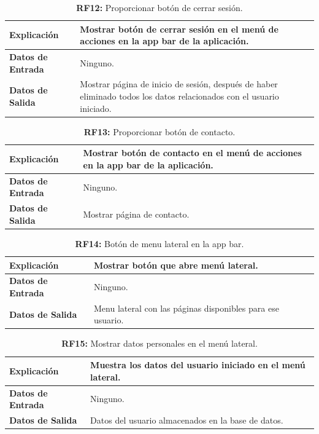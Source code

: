 \documentclass[a4paper, 12pt]{article}
\begin{document}
\begin{table}[H]
\captionsetup{justification=raggedright,singlelinecheck=false}
\caption{\textbf{RF12:} Proporcionar botón de cerrar sesión.}
\label{tab:RF12}
	\begin{tabular}{|m{5cm}|m{10cm}|}
	\hline
	\textbf{Explicación} & Mostrar botón de cerrar sesión en el menú de acciones en la app bar de la aplicación. \\ 
	\hline
	\textbf{Datos de Entrada} & Ninguno. \\ 
	\hline
	\textbf{Datos de Salida} & Mostrar página de inicio de sesión, después de haber eliminado todos los datos relacionados con el usuario iniciado. \\ 
	\hline
\end{tabular}
\end{table}

\begin{table}[H]
\captionsetup{justification=raggedright,singlelinecheck=false}
\caption{\textbf{RF13:} Proporcionar botón de contacto.}
\label{tab:RF13}
	\begin{tabular}{|m{5cm}|m{10cm}|}
	\hline
	\textbf{Explicación} & Mostrar botón de contacto en el menú de acciones en la app bar de la aplicación. \\ 
	\hline
	\textbf{Datos de Entrada} & Ninguno. \\ 
	\hline
	\textbf{Datos de Salida} & Mostrar página de contacto. \\ 
	\hline
\end{tabular}
\end{table}

\begin{table}[H]
\captionsetup{justification=raggedright,singlelinecheck=false}
\caption{\textbf{RF14:} Botón de menu lateral en la app bar.}
\label{tab:RF14}
	\begin{tabular}{|m{5cm}|m{10cm}|}
	\hline
	\textbf{Explicación} & Mostrar botón que abre menú lateral. \\ 
	\hline
	\textbf{Datos de Entrada} & Ninguno. \\ 
	\hline
	\textbf{Datos de Salida} & Menu lateral con las páginas disponibles para ese usuario. \\ 
	\hline
\end{tabular}
\end{table}

\begin{table}[H]
\captionsetup{justification=raggedright,singlelinecheck=false}
\caption{\textbf{RF15:} Mostrar datos personales en el menú lateral.}
\label{tab:RF15}
	\begin{tabular}{|m{5cm}|m{10cm}|}
	\hline
	\textbf{Explicación} & Muestra los datos del usuario iniciado en el menú lateral. \\ 
	\hline
	\textbf{Datos de Entrada} & Ninguno. \\ 
	\hline
	\textbf{Datos de Salida} & Datos del usuario almacenados en la base de datos. \\ 
	\hline
\end{tabular}
\end{table}
\end{document}
